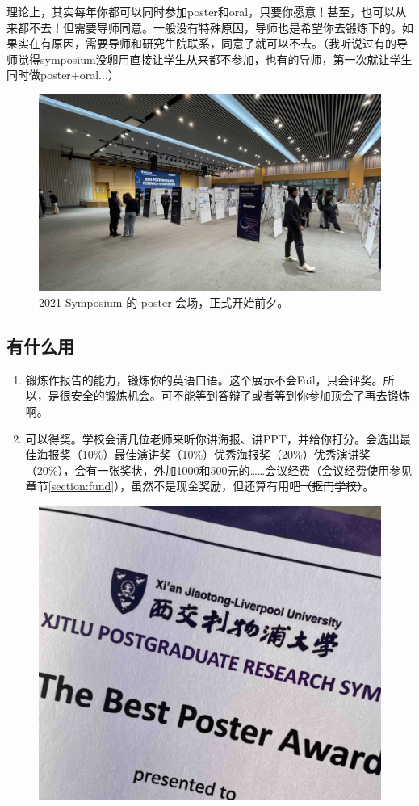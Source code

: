 理论上，其实每年你都可以同时参加poster和oral，只要你愿意！甚至，也可以从来都不去！但需要导师同意。一般没有特殊原因，导师也是希望你去锻炼下的。如果实在有原因，需要导师和研究生院联系，同意了就可以不去。（我听说过有的导师觉得symposium没卵用直接让学生从来都不参加，也有的导师，第一次就让学生同时做poster+oral...）

\begin{figure}[H]
    \caption{2021 Symposium 的 poster 会场，正式开始前夕。}
    \centering
    \includegraphics[width=\columnwidth]{author-folder/Kai.Wu/synposium_poster.jpg}
\end{figure}

\subsection{有什么用}

\begin{enumerate}
    \item 锻炼作报告的能力，锻炼你的英语口语。这个展示不会Fail，只会评奖。所以，是很安全的锻炼机会。可不能等到答辩了或者等到你参加顶会了再去锻炼啊。
    \item 可以得奖。学校会请几位老师来听你讲海报、讲PPT，并给你打分。会选出最佳海报奖（10\%）最佳演讲奖（10\%）优秀海报奖（20\%）优秀演讲奖（20\%），会有一张奖状，外加1000和500元的……会议经费（会议经费使用参见章节\ref{section:fund}），虽然不是现金奖励，但还算有用吧\sout{（抠门学校）}。
\end{enumerate}

\begin{figure}[H]
    \centering
    \includegraphics[width=0.4\columnwidth]{author-folder/Kai.Wu/poster_award.jpg}
\end{figure}

